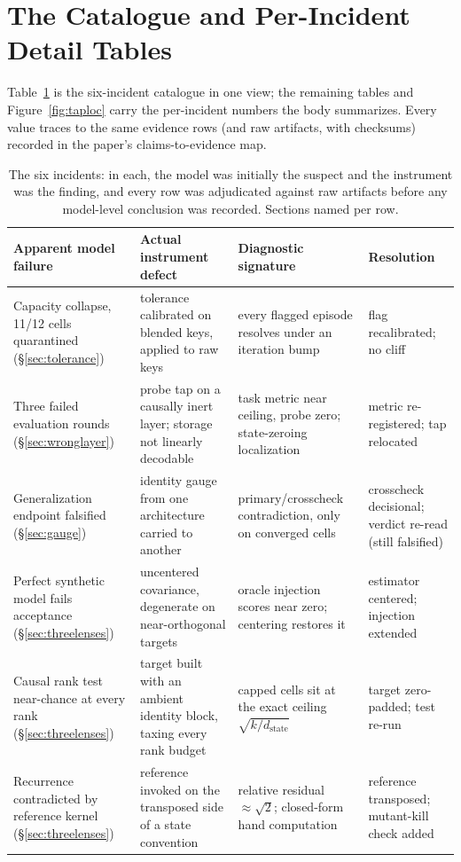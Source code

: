 \documentclass{article}
\newcommand{\dstate}{d_{\mathrm{state}}}
\begin{document}
\section{The Catalogue and Per-Incident Detail Tables}
\label{app:tables}

Table~\ref{tab:catalogue} is the six-incident catalogue in one view;
the remaining tables and Figure~\ref{fig:taploc} carry the
per-incident numbers the body summarizes. Every value traces to the
same evidence rows (and raw artifacts, with checksums) recorded in the
paper's claims-to-evidence map.

\begin{table}[H]
\centering
\scriptsize
\begin{tabular}{@{}p{2.4cm}p{3.3cm}p{3.4cm}p{2.7cm}@{}}
\toprule
Apparent model failure & Actual instrument defect & Diagnostic signature & Resolution \\
\midrule
Capacity collapse, 11/12 cells quarantined (\S\ref{sec:tolerance}) &
tolerance calibrated on blended keys, applied to raw keys &
every flagged episode resolves under an iteration bump &
flag recalibrated; no cliff \\
\addlinespace[2pt]
Three failed evaluation rounds (\S\ref{sec:wronglayer}) &
probe tap on a causally inert layer; storage not linearly decodable &
task metric near ceiling, probe zero; state-zeroing localization &
metric re-registered; tap relocated \\
\addlinespace[2pt]
Generalization endpoint falsified
(\S\ref{sec:gauge}) &
identity gauge from one architecture carried to another &
primary/crosscheck contradiction, only on converged cells &
crosscheck decisional; verdict re-read (still falsified) \\
\addlinespace[2pt]
Perfect synthetic model fails acceptance (\S\ref{sec:threelenses}) &
uncentered covariance, degenerate on near-orthogonal targets &
oracle injection scores near zero; centering restores it &
estimator centered; injection extended \\
\addlinespace[2pt]
Causal rank test near-chance at every rank
(\S\ref{sec:threelenses}) &
target built with an ambient identity block, taxing every rank
budget &
capped cells sit at the exact ceiling $\sqrt{k/\dstate}$ &
target zero-padded; test re-run \\
\addlinespace[2pt]
Recurrence contradicted by reference kernel
(\S\ref{sec:threelenses}) &
reference invoked on the transposed side of a state convention &
relative residual $\approx\sqrt{2}$; closed-form hand computation &
reference transposed; mutant-kill check added \\
\bottomrule
\end{tabular}
\caption{The six incidents: in each, the model was initially the
suspect and the instrument was the finding, and every row was
adjudicated against raw artifacts before any model-level conclusion
was recorded. Sections named per row.}
\label{tab:catalogue}
\end{table}
\end{document}
